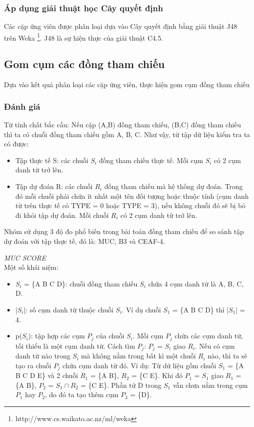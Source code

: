 \documentclass[12pt]{extarticle}
\begin{document}
			\subsubsection*{Áp dụng giải thuật học Cây quyết định}
				\par Các cặp ứng viên được phân loại dựa vào Cây quyết định bằng giải thuật J48 trên Weka \footnote{http://www.cs.waikato.ac.nz/ml/weka}. J48 là sự hiện thực của giải thuật C4.5.
		\subsection{Gom cụm các đồng tham chiếu}	
			\par Dựa vào kết quả phân loại các cặp ứng viên, thực hiện gom cụm đồng tham chiếu
			\subsubsection*{Đánh giá}
				\par Từ tính chất bắc cầu: Nếu cặp (A,B) đồng tham chiếu, (B,C) đồng  tham chiếu thì ta có chuỗi đồng tham chiếu gồm A, B, C. Như vậy, từ tập dữ liệu kiểm tra ta có được:
					\begin{itemize}
				 		\item{Tập thực tế S: các chuỗi $S_i$ đồng tham chiếu thực tế. Mỗi cụm $S_i$ có 2 cụm danh từ trở lên.}				
						\item{Tập dự đoán R: các chuỗi $R_i$ đồng tham chiếu mà hệ thống dự đoán. Trong đó mỗi chuỗi phải chứa ít nhất một tên đối tượng hoặc thuộc tính (cụm danh từ trên thực tế có TYPE = 0 hoặc TYPE = 3), nếu không chuỗi đó sẽ bị bỏ đi khỏi tập dự đoán. Mỗi chuỗi $R_i$ có 2 cụm danh từ trở lên.}
					\end{itemize}
				\par Nhóm sử dụng 3 độ đo phổ biến trong bài toán đồng tham chiếu để so sánh tập dự đoán với tập thực tế, đó là: MUC, B3 và CEAF-4.
				\par \textit{MUC SCORE}
				\\Một số khái niệm:
					\begin{itemize}
						\item{$S_i$ = \{A B C D\}: chuỗi đồng tham chiếu $S_i$ chứa 4 cụm danh từ là A, B, C, D.}
						\item{|$S_i$|: số cụm danh từ thuộc chuỗi $S_i$. Ví dụ chuỗi $S_1$ = \{A B C D\} thì |$S_1$| = 4.}
						\item{p($S_i$): tập hợp các cụm $P_j$ của chuỗi $S_i$. Mỗi cụm $P_j$ chứa các cụm danh từ, tối thiểu là một cụm danh từ. Cách tìm $P_j$: $P_j$ = $S_i$ giao $R_i$. Nếu có cụm danh từ nào trong $S_i$ mà không nằm trong bất kì một chuỗi $R_i$ nào, thì ta sẽ tạo ra chuỗi $P_j$ chứa cụm danh từ đó. Ví dụ: Từ dữ liệu gồm chuỗi $S_1$ = \{A B C D E\} và 2 chuỗi $R_1$ = \{A B\}, $R_2$ = \{C E\}. Khi đó $P_1$ = $S_1$ giao $R_1$ = \{A B\}, $P_2$ = $S_1 \cap R_2$ = \{C E\}. Phần tử D trong $S_1$ vẫn chưa nằm trong cụm $P_1$ hay $P_2$, do đó ta tạo thêm cụm $P_3$ = \{D\}.}
					\end{itemize}								
\end{document}

